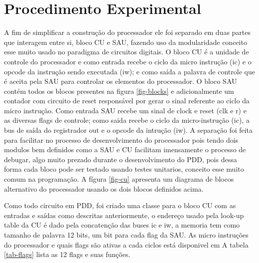 \documentclass[11pt, twocolumn]{article}
\begin{document}
\section{Procedimento Experimental}
  
A fim de simplificar a construção do processador ele foi separado em duas partes que interagem entre si, bloco CU e SAU, fazendo uso da modularidade conceito esse muito usado no paradigma de circuitos digitais.
O bloco CU é a unidade de controle do processador e como entrada recebe o ciclo da micro instrução (ic) e o opcode da instrução sendo executada (iw); e como saída a palavra de controle que é aceita pela SAU para controlar os elementos do processador.
O bloco SAU contém todos os blocos presentes na figura \ref{fig-blocks} e adicionalmente um contador com circuito de reset responsável por gerar o sinal referente ao ciclo da micro instrução.
Como entrada SAU recebe um sinal de clock e reset (clk e r) e as diversas flags de controle; como saida recebe o ciclo da micro-instrução (ic), a bus de saída do registrador out e o opcode da intrução (iw).
A separação foi feita para facilitar no processo de desenvolvimento do processador pois tendo dois modulos bem definidos como a SAU e CU facilitam imensamente o processo de debugar, algo muito prezado durante o desenvolvimento do PDD, pois dessa forma cada bloco pode ser testado usando testes unitarios, conceito esse muito comum na programação.
A fígura \ref{fig-cu} apresenta um diagrama de blocos alternativo do processador usando os dois blocos definidos acima.

Como todo circuito em PDD, foi criado uma classe para o bloco CU com as entradas e saídas como descritas anteriormente, o endereço usado pela look-up table da CU é dado pela concatenção das buses ic e iw, a memoria tem como tamanho de palavra 12 bits, um bit para cada flag da SAU.
As micro instruções do processador e quais flags são ativas a cada ciclos está disponivel em \cite{malv}
A tabela \ref{tab-flags} lista as 12 flags e suas funções. 
\end{document}
